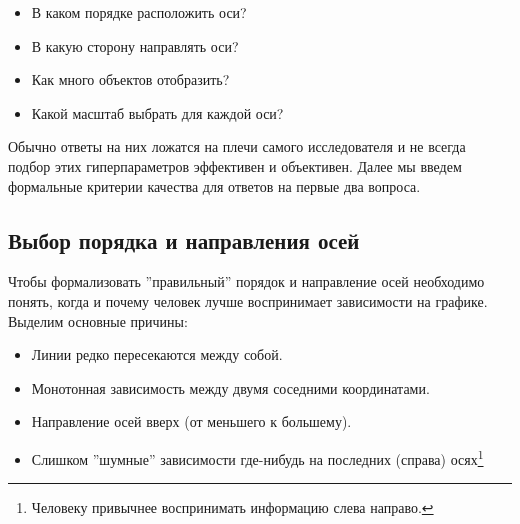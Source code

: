 \documentclass[12pt,fleqn]{article}
\begin{document}
\begin{itemize}
    \item В каком порядке расположить оси?
    \item В какую сторону направлять оси?
    \item Как много объектов отобразить?
    \item Какой масштаб выбрать для каждой оси?
\end{itemize}

\noindent Обычно ответы на них ложатся на плечи самого исследователя и не всегда подбор этих гиперпараметров эффективен и объективен.
Далее мы введем формальные критерии качества для ответов на первые два вопроса.

\subsection{Выбор порядка и направления осей}
Чтобы формализовать ''правильный'' порядок и направление осей необходимо понять, когда и почему
человек лучше воспринимает зависимости на графике. Выделим основные причины:

\begin{itemize}
    \item Линии редко пересекаются между собой.
    \item Монотонная зависимость между двумя соседними координатами.
    \item Направление осей вверх (от меньшего к большему).
    \item Слишком ''шумные'' зависимости где-нибудь на последних (справа) осях\footnote{Человеку привычнее воспринимать 
    информацию слева направо.}
\end{itemize}
\end{document}
